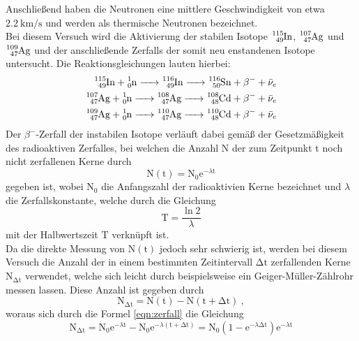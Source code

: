 Anschließend haben die Neutronen eine mittlere Geschwindigkeit von etwa $\SI{2.2}{\kilo\meter\per\second}$
und werden als thermische Neutronen bezeichnet. \\
Bei diesem Versuch wird die Aktivierung der stabilen Isotope
$\ce{^{115}_{49}In}$, $\ce{^{107}_{47}Ag}$ und $\ce{^{109}_{47}Ag}$
und der anschließende Zerfalls der somit neu enstandenen Isotope untersucht.
Die Reaktionsgleichungen lauten hierbei:
\begin{align}
  \ce{^{115}_{49}In + ^1_0n -> ^{116}_{49}In -> ^{116}_{50}Sn} + \beta^- + \bar{\nu}_e \\
  \ce{^{107}_{47}Ag + ^1_0n -> ^{108}_{47}Ag -> ^{108}_{48}Cd} + \beta^- + \bar{\nu}_e \\
  \ce{^{109}_{47}Ag + ^1_0n -> ^{110}_{47}Ag -> ^{110}_{48}Cd} + \beta^- + \bar{\nu}_e
\end{align}
Der $\beta^-$-Zerfall der instabilen Isotope verläuft dabei gemäß der Gesetzmäßigkeit des radioaktiven
Zerfalles, bei welchen die Anzahl N der zum Zeitpunkt t noch nicht zerfallenen
Kerne durch
\begin{equation}
  \text{N}(\text{t}) = \text{N}_0 \text{e}^{ -\lambda \text{t}}
  \label{eqn:zerfall}
\end{equation}
gegeben ist, wobei $\text{N}_0$ die Anfangszahl der radioaktivien Kerne bezeichnet und
$\lambda$ die Zerfallskonstante, welche durch die Gleichung
\begin{equation}
  \text{T} = \frac{\ln{2}}{\lambda}
  \label{eqn:zkonst}
\end{equation}
mit der Halbwertszeit T verknüpft ist. \\
Da die direkte Messung von $\text{N}(\text{t})$ jedoch sehr schwierig ist, werden bei diesem
Versuch die Anzahl der in einem bestimmten Zeitintervall $\increment\text{t}$ zerfallenden
Kerne $\text{N}_{\increment\text{t}}$ verwendet, welche sich leicht durch beispielsweise
ein Geiger-Müller-Zählrohr messen lassen.
Diese Anzahl ist gegeben durch
\begin{equation}
  \text{N}_{\increment\text{t}} = \text{N}(\text{t}) -\text{N}(\text{t} + \increment \text{t}) \:,
  \label{eqn:dN}
\end{equation}
woraus sich durch die Formel \ref{eqn:zerfall} die Gleichung
\begin{equation}
  \text{N}_{\increment\text{t}} =\text{N}_0 \text{e}^{ -\lambda \text{t}} - \text{N}_0 \text{e}^{ -\lambda (\text{t}+\increment \text{t})}
  = \text{N}_0 (1- \text{e}^{ -\lambda \increment \text{t}})\text{e}^{ -\lambda \text{t}}
  \label{eqn:N}
\end{equation}

